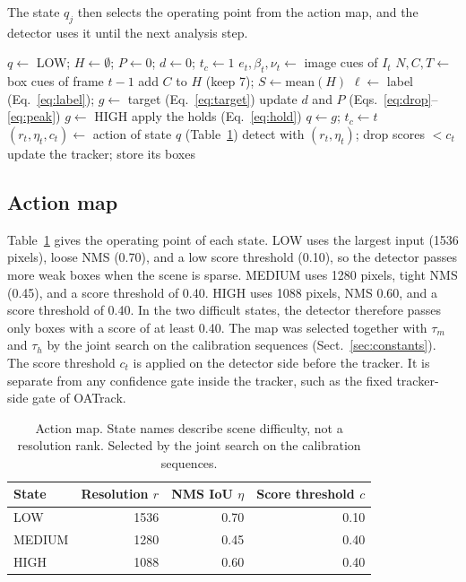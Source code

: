 \documentclass[pdflatex,sn-mathphys-num,iicol]{sn-jnl}
\begin{document}
The state $q_j$ then selects the operating point from the action map, and the
detector uses it until the next analysis step.

\begin{algorithm}[t]
\caption{AC-MOT controller for one video}\label{alg:controller}
\begin{algorithmic}[1]
\State $q\gets$ LOW; $H\gets\emptyset$; $P\gets0$; $d\gets0$; $t_c\gets1$
    \State $e_t,\beta_t,\nu_t\gets$ image cues of $I_t$
    \State $N,C,T\gets$ box cues of frame $t-1$
    \State add $C$ to $H$ (keep 7); $S\gets\mathrm{mean}(H)$
    \State $\ell\gets$ label (Eq.~\ref{eq:label}); $g\gets$ target (Eq.~\ref{eq:target})
    \State update $d$ and $P$ (Eqs.~\ref{eq:drop}--\ref{eq:peak})
     $g\gets$ HIGH
    \EndIf
    \State apply the holds (Eq.~\ref{eq:hold})
      \State $q\gets g$; $t_c\gets t$
    \EndIf
  \EndIf
  \State $(r_t,\eta_t,c_t)\gets$ action of state $q$ (Table~\ref{tab:actions})
  \State detect with $(r_t,\eta_t)$; drop scores $<c_t$
  \State update the tracker; store its boxes
\EndFor
\end{algorithmic}
\end{algorithm}

\subsection{Action map}
Table~\ref{tab:actions} gives the operating point of each state. LOW uses the
largest input (1536 pixels), loose NMS (0.70), and a low score threshold
(0.10), so the detector passes more weak boxes when the scene is sparse.
MEDIUM uses 1280 pixels, tight NMS (0.45), and a score threshold of 0.40.
HIGH uses 1088 pixels, NMS 0.60, and a score threshold of 0.40. In the two
difficult states, the detector therefore passes only boxes with a score of at
least 0.40. The map was selected together with $\tau_m$ and $\tau_h$ by the
joint search on the calibration sequences (Sect.~\ref{sec:constants}). The
score threshold $c_t$ is applied on the detector side before the tracker. It is
separate from any confidence gate inside the tracker, such as the fixed
tracker-side gate of OATrack.

\begin{table}[t]
\caption{Action map. State names describe scene difficulty, not a resolution
rank. Selected by the joint search on the calibration sequences.}
\label{tab:actions}
\centering\footnotesize
\begin{tabular}{@{}lrrr@{}}
\toprule
State & Resolution $r$ & NMS IoU $\eta$ & Score threshold $c$\\
\midrule
LOW & 1536 & 0.70 & 0.10\\
MEDIUM & 1280 & 0.45 & 0.40\\
HIGH & 1088 & 0.60 & 0.40\\
\bottomrule
\end{tabular}
\end{table}
\end{document}
